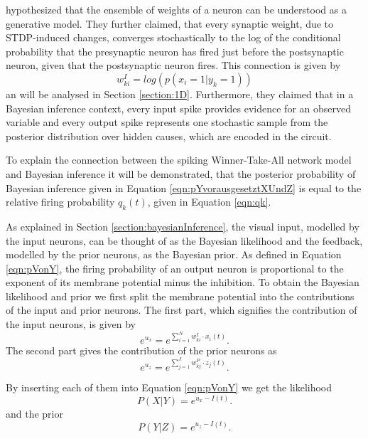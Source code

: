 \citet{nessler} hypothesized that the ensemble of weights of a neuron can be understood as a generative model. They further claimed, that every synaptic weight, due to STDP-induced changes,  converges stochastically to the log of the conditional probability that the presynaptic neuron has fired just before the postsynaptic neuron, given that the postsynaptic neuron fires. This connection is given by
\begin{equation}
\label{eqn:weightProbLink}
 w^{I}_{ki} = log(p(x_i = 1 | y_k = 1))
\end{equation}
an will be analysed in Section \ref{section:1D}.
Furthermore, they claimed that in a Bayesian inference context, every input spike provides evidence for an observed variable and every output spike represents one stochastic sample from the posterior distribution over hidden causes, which are encoded in the circuit. 

To explain the connection between the spiking Winner-Take-All network model and Bayesian inference it will be demonstrated, that the posterior probability of Bayesian inference given in Equation \ref{eqn:pYvorausgesetztXUndZ} is equal to the relative firing probability $q_k(t)$, given in Equation \ref{eqn:qk}.

As explained in Section \ref{section:bayesianInference}, the visual input, modelled by the input neurons, can be thought of as the Bayesian likelihood and the feedback, modelled by the prior neurons, as the Bayesian prior. As defined in Equation \ref{eqn:pVonY}, the firing probability of an output neuron is proportional to the exponent of its membrane potential minus the inhibition. To obtain the Bayesian likelihood and prior we first split the membrane potential into the contributions of the input and prior neurons. The first part, which signifies the contribution of the input neurons, is given by
\begin{equation}
e^{u_x} = e^{\sum_{i=1}^N w^{I}_{ki} \cdot x_i(t)}.
\end{equation}
The second part gives the contribution of the prior neurons as
\begin{equation}
e^{u_z} = e^{\sum_{j=1}^J w^{P}_{kj} \cdot z_j(t)}.
\end{equation}

By inserting each of them into Equation \ref{eqn:pVonY} we get the likelihood
\begin{equation}
P(X|Y) = e^{u_x - I(t)}.
\end{equation}
and the prior
\begin{equation}
P(Y|Z) = e^{u_z - I(t)}.
\end{equation}

